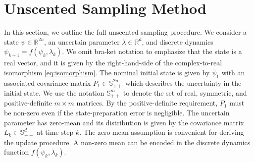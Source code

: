 \section{Unscented Sampling Method}
\label{appendix:unscented}
In this section, we outline the full unscented sampling procedure.
We consider a state $\psi \in \mathbb{R}^{2n}$, 
an uncertain parameter $\lambda \in \mathbb{R}^{d}$, and discrete dynamics
$\psi_{k + 1} = f(\psi_{k}, \lambda_{k})$.
We omit bra-ket notation to emphasize that
the state is a real vector, and it is given by the right-hand-side of the
complex-to-real isomorphism \eqref{eq:isomorphism}.
The nominal initial state is given by $\bar{\psi}_{1}$ with an associated
covariance matrix $P_{1} \in \mathbb{S}_{++}^{2n}$
which describes the uncertainty in the initial state.
We use the notation $\mathbb{S}_{++}^{m}$ to denote the
set of real, symmetric, and positive-definite $m \times m$ matrices.
By the positive-definite requirement, $P_{1}$ must be non-zero even if the state-preparation error
is negligible.
The uncertain parameter has zero-mean
and its distribution is given by the covariance matrix
$L_{k} \in \mathbb{S}_{++}^{d}$ at time step $k$. The zero-mean assumption
is convenient for deriving the update procedure. A non-zero mean can be encoded
in the discrete dynamics function $f(\psi_{k}, \lambda_{k})$.

